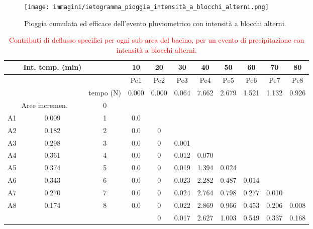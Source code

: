 \begin{figure}[H]  \centering
    \texttt{[image: immagini/ietogramma\_pioggia\_intensità\_a\_blocchi\_alterni.png]}
    \caption{Pioggia cumulata ed efficace dell'evento pluviometrico con intensità a blocchi alterni.}
    \label{ietogramma_pioggia_intensità_a_blocchi_alterni}
\end{figure}

\begin{table}[H] \centering
\caption{\textcolor{red}{Contributi di deflusso specifici per ogni sub-area del bacino, per un evento di precipitazione con intensità a blocchi alterni.}}
    \begin{tabular}{ccccccccccc}
\toprule
& Int. temp. (min) &  & 10    & 20    & 30    & 40    & 50    & 60    & 70    & 80    \\
\midrule
& & & Pe1   & Pe2   & Pe3   & Pe4   & Pe5   & Pe6   & Pe7   & Pe8   \\
&& tempo (N) & 0.000 & 0.000 & 0.064 & 7.662 & 2.679 & 1.521 & 1.132 & 0.926 \\
    \multicolumn{2}{c}{Aree incremen.}  & 0         &       &       &       &       &       &       &       &       \\
    A1        & 0.009                      & 1         & 0.0   &       &       &       &       &       &       &       \\
    A2        & 0.182                      & 2         & 0.0   & 0     &       &       &       &       &       &       \\
    A3        & 0.298                      & 3         & 0.0   & 0     & 0.001 &       &       &       &       &       \\
    A4        & 0.361                      & 4         & 0.0   & 0     & 0.012 & 0.070 &       &       &       &       \\
    A5        & 0.374                      & 5         & 0.0   & 0     & 0.019 & 1.394 & 0.024 &       &       &       \\
    A6        & 0.343                      & 6         & 0.0   & 0     & 0.023 & 2.282 & 0.487 & 0.014 &       &       \\
    A7        & 0.270                      & 7         & 0.0   & 0     & 0.024 & 2.764 & 0.798 & 0.277 & 0.010 &       \\
    A8        & 0.174                      & 8         & 0.0   & 0     & 0.022 & 2.869 & 0.966 & 0.453 & 0.206 & 0.008 \\
     &                            &           &       & 0     & 0.017 & 2.627 & 1.003 & 0.549 & 0.337 & 0.168 \\

\end{tabular}
\end{table}
